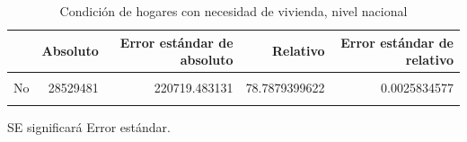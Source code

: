 \documentclass[
]{article}
\newenvironment{Shaded}{\begin{snugshade}}{\end{snugshade}}
\newcommand{\DataTypeTok}[1]{\textcolor[rgb]{0.13,0.29,0.53}{#1}}
\newcommand{\DecValTok}[1]{\textcolor[rgb]{0.00,0.00,0.81}{#1}}
\newcommand{\KeywordTok}[1]{\textcolor[rgb]{0.13,0.29,0.53}{\textbf{#1}}}
\newcommand{\NormalTok}[1]{#1}
\newcommand{\OperatorTok}[1]{\textcolor[rgb]{0.81,0.36,0.00}{\textbf{#1}}}
\newcommand{\StringTok}[1]{\textcolor[rgb]{0.31,0.60,0.02}{#1}}
\begin{document}
\begin{table}[H]

\caption{\label{tab:unnamed-chunk-14}Condición de hogares con necesidad de vivienda, nivel nacional}
\centering
\begin{tabular}[t]{lrrrr}
\toprule
  & Absoluto & Error estándar de absoluto & Relativo & Error estándar de relativo\\
\midrule
\cellcolor{gray!6}{Si} & \cellcolor{gray!6}{7628562} & \cellcolor{gray!6}{105958.232900} & \cellcolor{gray!6}{21.0672842192} & \cellcolor{gray!6}{0.0025763631}\\
No & 28529481 & 220719.483131 & 78.7879399622 & 0.0025834577\\
\cellcolor{gray!6}{No sabe} & \cellcolor{gray!6}{52424} & \cellcolor{gray!6}{7310.702217} & \cellcolor{gray!6}{0.1447758185} & \cellcolor{gray!6}{0.0002021010}\\
\bottomrule
\end{tabular}
\end{table}

SE significará Error estándar.

\begin{Shaded}
\end{Shaded}
\end{document}
